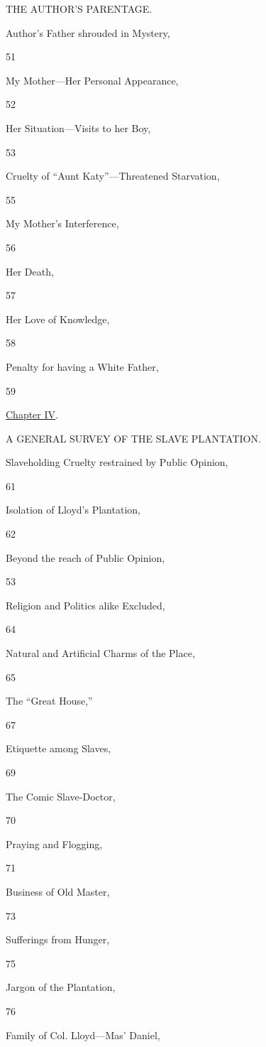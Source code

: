 THE AUTHOR'S PARENTAGE.

Author's Father shrouded in Mystery,

51

My Mother---Her Personal Appearance,

52

Her Situation---Visits to her Boy,

53

Cruelty of ``Aunt Katy''---Threatened Starvation,

55

My Mother's Interference,

56

Her Death,

57

Her Love of Knowledge,

58

Penalty for having a White Father,

59

\href{/wiki/My_Bondage_and_My_Freedom_(1855)/Chapter_IV}{Chapter IV}.

A GENERAL SURVEY OF THE SLAVE PLANTATION.

Slaveholding Cruelty restrained by Public Opinion,

61

Isolation of Lloyd's Plantation,

62

Beyond the reach of Public Opinion,

{53}

Religion and Politics alike Excluded,

64

Natural and Artificial Charms of the Place,

65

The ``Great House,''

67

Etiquette among Slaves,

69

The Comic Slave-Doctor,

70

Praying and Flogging,

71

Business of Old Master,

73

Sufferings from Hunger,

75

Jargon of the Plantation,

76

Family of Col. Lloyd---Mas' Daniel,

